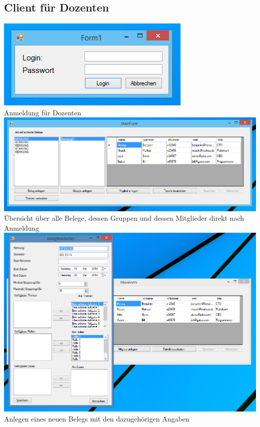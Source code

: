 \documentclass{article}
\begin{document}
\subsection{Client für Dozenten}
\begin{center}
    \includegraphics{bilder/doz1.PNG}\\
    Anmeldung für Dozenten \\
    
    \includegraphics[scale=0.6]{bilder/doz2.PNG}\\
    Übersicht über alle Belege, dessen Gruppen und dessen Mitglieder direkt nach Anmeldung \\
    
    \includegraphics[scale=0.55]{bilder/doz3.PNG}\\
    Anlegen eines neuen Belegs mit den dazugehörigen Angaben \\
    

\end{center}
\end{document}
